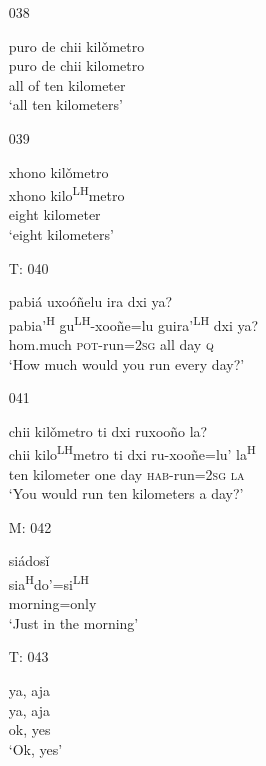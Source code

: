 \begin{itemize}
\item[038]
 
\glll   puro de chii kil\v{o}metro\\
puro de chii kilometro\\
all of ten kilometer\\
\glt `all ten kilometers'\\
 


\item[039]
 
\glll    xhono kil\v{o}metro\\
 xhono kilo\textsuperscript{LH}metro\\
eight kilometer\\
\glt `eight kilometers'
 

 
 
\item[T: 040]
 
pabi\'{a} uxo\'{o}\~{n}elu ira dxi ya?\\
pabia'\textsuperscript{H} gu\textsuperscript{LH}-xoo\~{n}e=lu guira'\textsuperscript{LH} dxi ya?\\
hom.much \textsc{pot}-run=\textsc{2sg} all day \textsc{q}\\
\glt `How much would you run every day?'
 

\item[041]
 
chii kil\v{o}metro ti dxi ruxoo\~{n}o la?\\
 chii kilo\textsuperscript{LH}metro ti dxi ru-xoo\~{n}e=lu' la\textsuperscript{H}\\
 ten kilometer one day \textsc{hab}-run=\textsc{2sg} \textsc{la}\\
\glt `You would run ten kilometers a day?' 
 

\item[M: 042]
 
\glll   si\'{a}dos\v{i}\\
sia\textsuperscript{H}do'=si\textsuperscript{LH}\\
morning=only\\
\glt `Just in the morning'
 

\item[T: 043]
 
\glll   ya, aja\\
ya, aja\\
ok, yes\\
\glt `Ok, yes'
 



\end{itemize}
